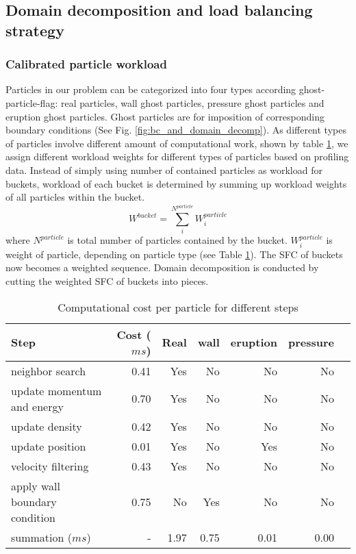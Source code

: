 \subsection{Domain decomposition and load balancing strategy}
\label{sect:load_balance}

\subsubsection{Calibrated particle workload} \label{sec:Weighted_work_load}
Particles in our problem can be categorized into four types according ghost-particle-flag: real particles, wall ghost particles, pressure ghost particles and eruption ghost particles. Ghost particles are for imposition of corresponding boundary conditions (See Fig. \ref{fig:bc_and_domain_decomp}). As different types of particles involve different amount of computational work, shown by table \ref{tab:Computational_cost_steps}, we assign different workload weights for different types of particles based on profiling data. Instead of simply using number of contained particles as workload for buckets, workload of each bucket is determined by summing up workload weights of all particles within the bucket.
\begin{equation}
W^{bucket} = \sum_i^{N^{particle}} W_i^{particle}
\label{eq:work-load-bucket}
\end{equation}
where $N^{particle}$ is total number of particles contained by the bucket. $W_i^{particle}$ is weight of particle, depending on particle type (see Table \ref{tab:Computational_cost_steps}).
The SFC of buckets now becomes a weighted sequence. Domain decomposition is conducted by cutting the weighted SFC of buckets into pieces.

\begin{table}
\centering
\caption{Computational cost per particle for different steps}	
\label{tab:Computational_cost_steps}
	  \begin{tabular}{lrrrrrr}
	    \hline
	    Step & Cost ($ms$) & Real & wall & eruption & pressure\\
	    \hline
	    neighbor search & 0.41 & Yes & No & No & No \\
	    update momentum and energy & 0.70 & Yes & No & No & No\\
	    update density & 0.42 & Yes & No & No & No \\
	    update position & 0.01 & Yes & No & Yes &  No\\
	    velocity filtering& 0.43 & Yes & No & No & No\\
	    apply wall boundary condition     & 0.75 & No & Yes & No & No\\
	    summation ($ms$) & - & 1.97 & 0.75 & 0.01 & 0.00\\
	    \hline
	  \end{tabular}
\end{table}

